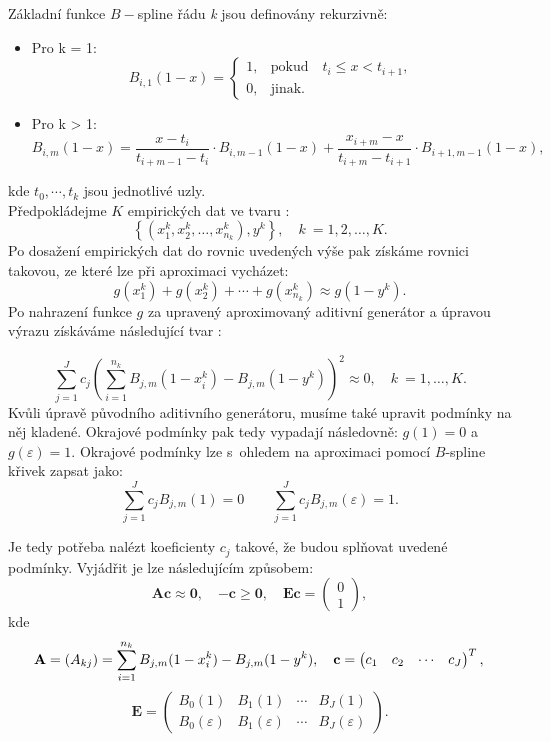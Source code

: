 Základní funkce $B-$spline řádu \textit{k} jsou definovány rekurzivně: \cite{Beliakov} \\
\begin{itemize}
    \item Pro k = 1:
\[
B_{i,1}(1-x) = 
\begin{cases}
    1, & \text{pokud} \quad t_i \leq x < t_{i+1}, \\
    0, & \text{jinak.}
\end{cases}
\]

 \item Pro k > 1:
\[
B_{i,m}(1-x) = \frac{x - t_i}{t_{i + m - 1} - t_i} \cdot B_{i, m - 1}(1-x)
+ \frac{x_{i + m} - x}{t_{i + m} - t_{i + 1}} \cdot B_{i + 1, m - 1}(1-x),
\]
\end{itemize}
kde \textit{$t_0, \cdots, t_k$} jsou jednotlivé uzly.  \\
Předpokládejme $K$ empirických dat ve tvaru \cite{Beliakov}:
$$
  \left\{ (x_1^k, x_2^k, \dots, x_{n_k}^k), y^k \right\}, \quad k~= 1, 2, \dots, K.
$$
Po dosažení empirických dat do rovnic uvedených výše pak získáme rovnici takovou, ze které lze při aproximaci vycházet: 
$$
  g(x_1^k)+g(x_2^k)+\cdots + g(x_{n_k}^k) \approx g(1-y^k).
$$
Po nahrazení funkce $g$ za upravený aproximovaný aditivní generátor a \' upravou výrazu získáváme následující tvar \cite{Beliakov}:


$$
  \sum_{j = 1}^Jc_j\left( \sum_{i=1}^{n_k}B_{j,m}(1-x_i^k) - B_{j,m}(1-y^k) \right)^2 \approx 0, \quad k~= 1,\dots,K.
$$
Kv\r uli \' upravě p\r uvodního aditivního generátoru, musíme také upravit podmínky na něj kladené. Okrajové podmínky pak tedy vypadají následovně: $ g(1)=0$ a $g(\varepsilon) = 1$.
Okrajové podmínky lze s~ohledem na aproximaci pomocí $B$-spline křivek zapsat jako:
$$
  \sum_{j = 1}^Jc_jB_{j,m}(1) = 0\quad\quad\sum_{j = 1}^Jc_jB_{j,m}(\varepsilon) = 1.
$$

Je tedy potřeba nalézt koeficienty $c_j$ takové, že budou spl\v novat uvedené podmínky. Vyjádřit je lze následujícím zp\r usobem: \cite{havlena} $$\mathbf{Ac} \approx \mathbf{0},\quad\mathbf{-c} \geq \mathbf{0},\quad\mathbf{Ec} = \begin{pmatrix} 0 \\ 1 \end{pmatrix},$$ 
kde $$\mathbf{A} = (A_{kj}) = \sum_{i = 1}^{n_k}B_{j,m}(1-x_i^k) - B_{j,m}(1-y^k),\quad \mathbf{c} = \begin{pmatrix} c_1 & c_2 &\cdots&c_J \end{pmatrix}^T,\\$$
  $$\mathbf{E} = \begin{pmatrix} B_0(1) & B_1(1) &\cdots& B_J(1) \\ B_0(\varepsilon) & B_1(\varepsilon) &\cdots& B_J(\varepsilon) \end{pmatrix}.$$\\

